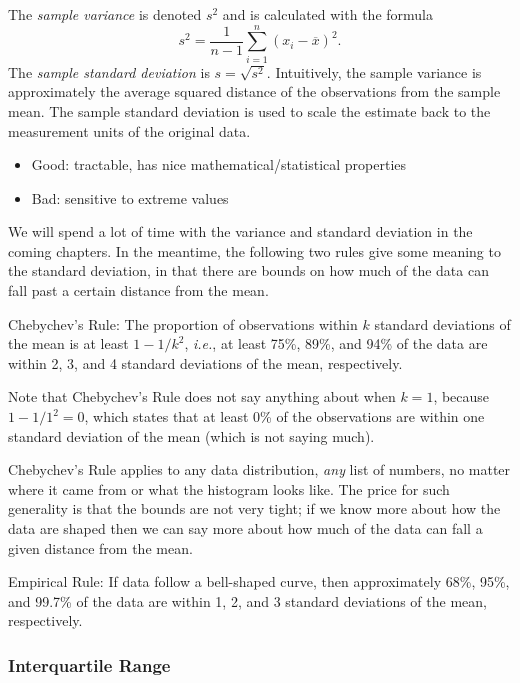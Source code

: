 \documentclass[captions=tableheading]{scrbook}
\begin{document}
The \emph{sample variance} is denoted \(s^{2}\) and is calculated with the formula
\begin{equation}
s^{2}=\frac{1}{n-1}\sum_{i=1}^{n}(x_{i}-\overline{x})^{2}.
\end{equation}
The \emph{sample standard deviation} is \(s=\sqrt{s^{2}}\). Intuitively, the sample variance is approximately the average squared distance of the observations from the sample mean. The sample standard deviation is used to scale the estimate back to the measurement units of the original data.
\begin{itemize}
\item Good: tractable, has nice mathematical/statistical properties
\item Bad: sensitive to extreme values
\end{itemize}
We will spend a lot of time with the variance and standard deviation in the coming chapters. In the meantime, the following two rules give some meaning to the standard deviation, in that there are bounds on how much of the data can fall past a certain distance from the mean.

\begin{fact}
Chebychev's Rule: The proportion of observations within \(k\) standard deviations of the mean is at least \(1-1/k^{2}\), \emph{i.e.}, at least 75\%, 89\%, and 94\% of the data are within 2, 3, and 4 standard deviations of the mean, respectively.
\end{fact}

Note that Chebychev's Rule does not say anything about when \(k=1\), because \(1-1/1^{2}=0\), which states that at least 0\% of the observations are within one standard deviation of the mean (which is not saying much).

Chebychev's Rule applies to any data distribution, \emph{any} list of numbers, no matter where it came from or what the histogram looks like. The price for such generality is that the bounds are not very tight; if we know more about how the data are shaped then we can say more about how much of the data can fall a given distance from the mean.

\begin{fact}
Empirical Rule: If data follow a bell-shaped curve, then approximately 68\%, 95\%, and 99.7\% of the data are within 1, 2, and 3 standard deviations of the mean, respectively. 
\end{fact}
\subsubsection{Interquartile Range}
\label{sec-3-3-4-2}
\end{document}
